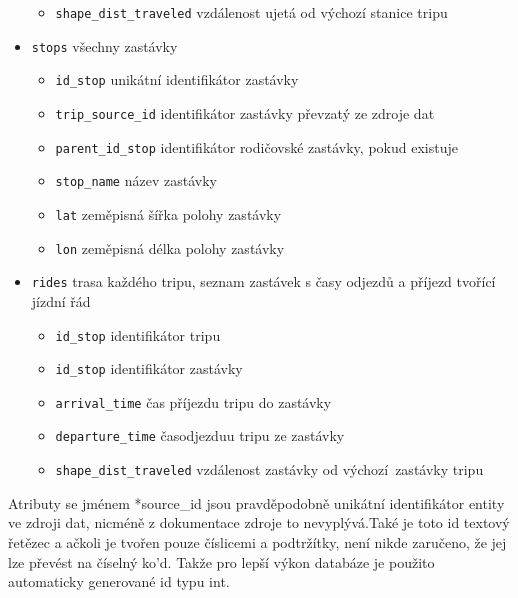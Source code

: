 \begin{itemize}
\begin{itemize}
			\item \verb-shape_dist_traveled- vzdálenost ujetá od výchozí stanice tripu

		\end{itemize}

	\item \verb-stops- všechny zastávky

		\begin{itemize}
			\item \verb-id_stop- unikátní identifikátor zastávky

			\item \verb-trip_source_id- identifikátor zastávky převzatý ze zdroje dat

			\item \verb-parent_id_stop- identifikátor rodičovské zastávky, pokud existuje

			\item \verb-stop_name- název zastávky

			\item \verb-lat- zeměpisná šířka polohy zastávky

			\item \verb-lon- zeměpisná délka polohy zastávky

		\end{itemize}

	\item \verb-rides- trasa každého tripu, seznam zastávek s časy odjezdů a příjezd tvořící jízdní řád

	\begin{itemize}
		\item \verb-id_stop- identifikátor tripu

		\item \verb-id_stop- identifikátor zastávky

		\item \verb-arrival_time- čas příjezdu tripu do zastávky

		\item \verb-departure_time- časodjezduu tripu ze zastávky

		\item \verb-shape_dist_traveled- vzdálenost zastávky od výchozí zastávky tripu

	\end{itemize}

\end{itemize}

Atributy se jménem *source\_id jsou pravděpodobně unikátní identifikátor entity ve zdroji dat, nicméně z dokumentace zdroje to nevyplývá.Také je toto id textový řetězec a ačkoli je tvořen pouze číslicemi a podtržítky, není nikde zaručeno, že jej lze převést na číselný ko'd. Takže pro lepší výkon databáze je použito automaticky generované id typu \gls{int}.

